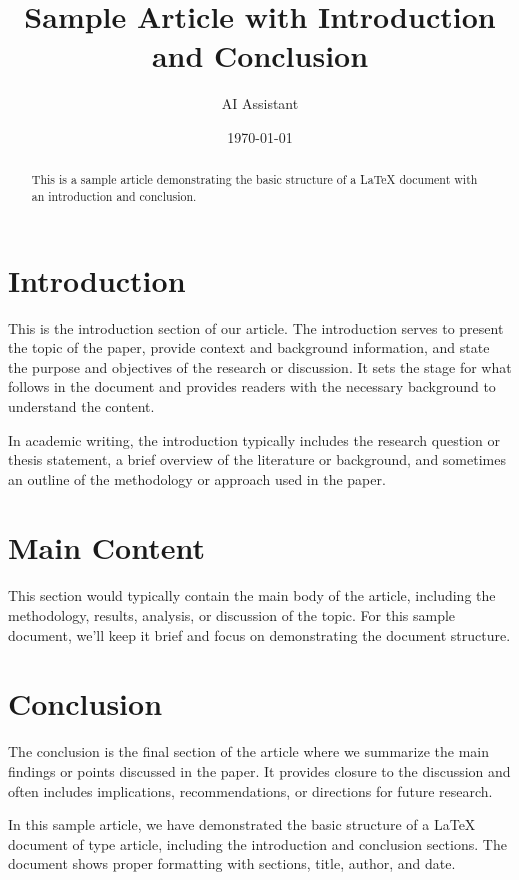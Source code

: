 \documentclass{article}
\title{Sample Article with Introduction and Conclusion}
\author{AI Assistant}
\date{\today}
\begin{document}
\maketitle

\begin{abstract}
This is a sample article demonstrating the basic structure of a LaTeX document with an introduction and conclusion.
\end{abstract}

\section{Introduction}
This is the introduction section of our article. The introduction serves to present the topic of the paper, provide context and background information, and state the purpose and objectives of the research or discussion. It sets the stage for what follows in the document and provides readers with the necessary background to understand the content.

In academic writing, the introduction typically includes the research question or thesis statement, a brief overview of the literature or background, and sometimes an outline of the methodology or approach used in the paper.

\section{Main Content}
This section would typically contain the main body of the article, including the methodology, results, analysis, or discussion of the topic. For this sample document, we'll keep it brief and focus on demonstrating the document structure.

\section{Conclusion}
The conclusion is the final section of the article where we summarize the main findings or points discussed in the paper. It provides closure to the discussion and often includes implications, recommendations, or directions for future research.

In this sample article, we have demonstrated the basic structure of a LaTeX document of type article, including the introduction and conclusion sections. The document shows proper formatting with sections, title, author, and date.
\end{document}
